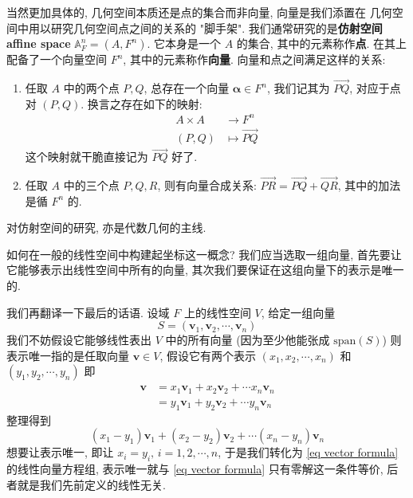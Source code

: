 \documentclass[UTF8]{book}
\begin{document}
\begin{remark}
    当然更加具体的, 几何空间本质还是点的集合而非向量, 向量是我们添置在
    几何空间中用以研究几何空间点之间的关系的 "脚手架". 
    我们通常研究的是\textbf{仿射空间 affine space} 
    $\mathbb{A}_F^n = (A,F^n)$. 
    它本身是一个 $A$ 的集合, 其中的元素称作\textbf{点}. 
    在其上配备了一个向量空间 $F^n$, 其中的元素称作\textbf{向量}. 
    向量和点之间满足这样的关系: 
    \begin{enumerate}[(1)]
        \item 任取 $A$ 中的两个点 $P,Q$, 
        总存在一个向量 $\boldsymbol{\alpha} \in F^n$, 
        我们记其为 $\overrightarrow{PQ}$,
        对应于点对 $(P,Q)$. 换言之存在如下的映射: 
        $$ \begin{aligned}
            A \times A &\to F^n \\
            (P,Q) & \mapsto \overrightarrow{PQ}
        \end{aligned}$$ 
        这个映射就干脆直接记为 $\overrightarrow{PQ}$ 好了. 
        \item 任取 $A$ 中的三个点 $P,Q,R$, 
        则有向量合成关系: 
        $\overrightarrow{PR} = \overrightarrow{PQ} + 
        \overrightarrow{QR}$, 其中的加法是循 $F^n$ 的. 
    \end{enumerate}
    对仿射空间的研究, 亦是代数几何的主线. 
\end{remark}

如何在一般的线性空间中构建起坐标这一概念? 
我们应当选取一组向量, 首先要让它能够表示出线性空间中所有的向量, 
其次我们要保证在这组向量下的表示是唯一的. 

我们再翻译一下最后的话语. 
设域 $F$ 上的线性空间 $V$, 给定一组向量 
$$S=(\boldsymbol{v}_1,\boldsymbol{v}_2,\cdots,\boldsymbol{v}_n)$$ 
我们不妨假设它能够线性表出 $V$ 中的所有向量 
(因为至少他能张成 $\mathrm{span}(S)$) 
则表示唯一指的是任取向量 $\boldsymbol{v} \in V$, 
假设它有两个表示 $(x_1,x_2,\cdots,x_n)$ 和 $(y_1,y_2,\cdots,y_n)$ 
即 
$$ \begin{aligned}
\boldsymbol{v} &= x_1\boldsymbol{v}_1 + x_2 \boldsymbol{v}_2 + 
\cdots x_n\boldsymbol{v}_n \\
&= y_1\boldsymbol{v}_1 + y_2 \boldsymbol{v}_2 + 
\cdots y_n\boldsymbol{v}_n
\end{aligned}$$
整理得到 
$$ (x_1-y_1)\boldsymbol{v}_1 + (x_2-y_2) \boldsymbol{v}_2 + 
\cdots (x_n-y_n)\boldsymbol{v}_n $$
想要让表示唯一, 即让 $x_i = y_i,\,i=1,2,\cdots,n$, 
于是我们转化为 \eqref{eq vector formula} 的线性向量方程组, 
表示唯一就与 \eqref{eq vector formula} 只有零解这一条件等价, 
后者就是我们先前定义的线性无关. 
\end{document}
